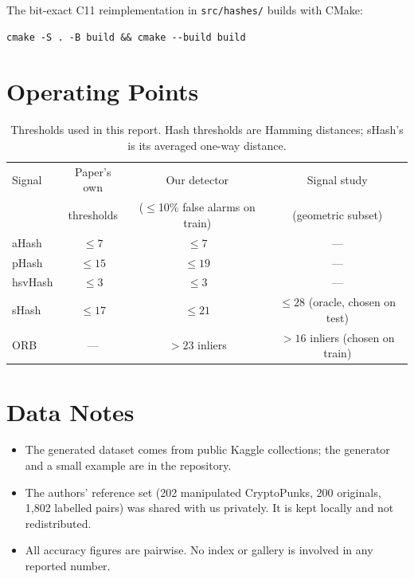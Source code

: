 The bit-exact C11 reimplementation in \texttt{src/hashes/} builds with CMake:
\begin{lstlisting}
cmake -S . -B build && cmake --build build
\end{lstlisting}

\section{Operating Points}

\begin{table}[ht]
\centering
\begin{tabular}{@{}lccc@{}}
\toprule
Signal & Paper's own & Our detector & Signal study \\
       & thresholds        & ($\le$10\% false alarms on train) & (geometric subset) \\
\midrule
aHash   & $\le 7$  & $\le 7$  & --- \\
pHash   & $\le 15$ & $\le 19$ & --- \\
hsvHash & $\le 3$  & $\le 3$  & --- \\
sHash   & $\le 17$ & $\le 21$ & $\le 28$ (oracle, chosen on test) \\
ORB     & ---      & $> 23$ inliers & $> 16$ inliers (chosen on train) \\
\bottomrule
\end{tabular}
\caption{Thresholds used in this report. Hash thresholds are Hamming distances; sHash's is its
averaged one-way distance.}
\label{tab:thresholds}
\end{table}

\section{Data Notes}

\begin{itemize}
  \item The generated dataset comes from public Kaggle collections; the generator and a small
        example are in the repository.
  \item The authors' reference set (202 manipulated CryptoPunks, 200 originals, 1,802 labelled
        pairs) was shared with us privately. It is kept locally and not redistributed.
  \item All accuracy figures are pairwise. No index or gallery is involved in any reported
        number.
\end{itemize}
